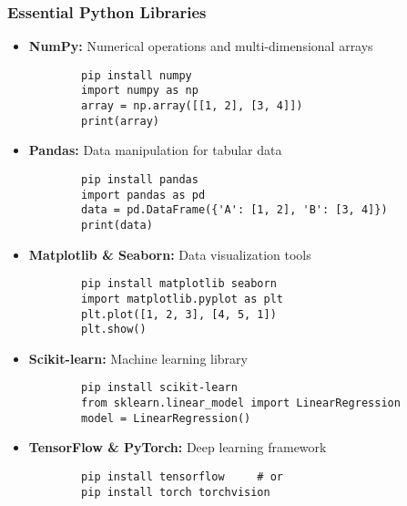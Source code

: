 \documentclass[aspectratio=169]{beamer}
\begin{document}
\begin{frame}[fragile]
    \frametitle{Essential Python Libraries}
    \begin{itemize}
        \item \textbf{NumPy:} Numerical operations and multi-dimensional arrays
        \begin{lstlisting}
        pip install numpy
        import numpy as np
        array = np.array([[1, 2], [3, 4]])
        print(array)
        \end{lstlisting}

        \item \textbf{Pandas:} Data manipulation for tabular data
        \begin{lstlisting}
        pip install pandas
        import pandas as pd
        data = pd.DataFrame({'A': [1, 2], 'B': [3, 4]})
        print(data)
        \end{lstlisting}

        \item \textbf{Matplotlib \& Seaborn:} Data visualization tools
        \begin{lstlisting}
        pip install matplotlib seaborn
        import matplotlib.pyplot as plt
        plt.plot([1, 2, 3], [4, 5, 1])
        plt.show()
        \end{lstlisting}

        \item \textbf{Scikit-learn:} Machine learning library
        \begin{lstlisting}
        pip install scikit-learn
        from sklearn.linear_model import LinearRegression
        model = LinearRegression()
        \end{lstlisting}

        \item \textbf{TensorFlow \& PyTorch:} Deep learning framework
        \begin{lstlisting}
        pip install tensorflow     # or
        pip install torch torchvision
        \end{lstlisting}
    \end{itemize}
\end{frame}
\end{document}
